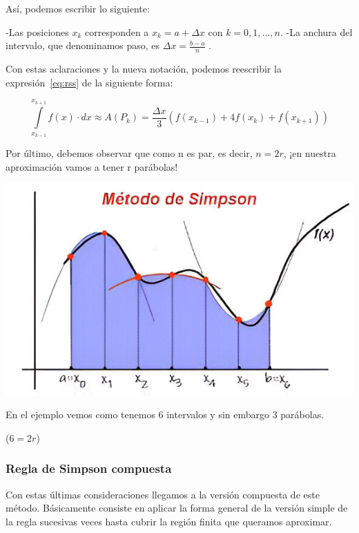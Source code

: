 \documentclass[12pt]{article}
\begin{document}
Así, podemos escribir lo siguiente:

\begin{flushleft}
-Las posiciones $x_k$ corresponden a $x_k=a+\Delta x$ con $k=0,1,...,n$.\newline
-La anchura del intervalo, que denominamos paso, es $\Delta x=\frac{b-a}{n}$ .
\end{flushleft}

Con estas aclaraciones y la nueva notación, podemos reescribir la expresión~\ref{eq:rss} de la siguiente forma:

\begin{equation}
\int \limits_{x_{k-1}}^{x_{k+1}} f(x) \cdot dx \approx 
A(P_k) =
\frac{\Delta x}{3}(f(x_{k-1})+4f(x_k)+f(x_{k+1}))
\end{equation}

Por último, debemos observar que como n es par, es decir, $n=2r$, ¡en nuestra aproximación vamos a tener r parábolas!\\

\begin{center}
\includegraphics[scale=0.45]{rpara}
\end{center}

En el ejemplo vemos como tenemos 6 intervalos y sin embargo 3 parábolas. \begin{center}($6=2r$)\end{center}

\subsubsection{Regla de Simpson compuesta}

Con estas últimas consideraciones llegamos a la versión compuesta de este método. Básicamente consiste en aplicar la forma general de la versión simple de la regla sucesivas veces hasta cubrir la región finita que queramos aproximar.\\
\end{document}

